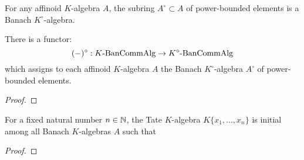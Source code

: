             \begin{lemma} \label{lemma: power_bounded_subrings_of_affinoid_algebras_are_banach}
                For any affinoid $K$-algebra $A$, the subring $A^{\circ} \subset A$ of power-bounded elements is a Banach $K^{\circ}$-algebra.
            \end{lemma}
            \begin{proposition} \label{prop: unit_discs_are_mapped_to_unit_discs}
                There is a functor:
                    $$(-)^{\circ}: K\text{-}\mathrm{Ban}\mathrm{Comm}\mathrm{Alg} \to K^{\circ}\text{-}\mathrm{Ban}\mathrm{Comm}\mathrm{Alg}$$
                which assigns to each affinoid $K$-algebra $A$ the Banach $K^{\circ}$-algebra $A^{\circ}$ of power-bounded elements. 
            \end{proposition}
                \begin{proof}
                    
                \end{proof}
            \begin{proposition} \label{prop: tate_algebras_are_free_affinoid_algebras}
                For a fixed natural number $n \in \mathbb{N}$, the Tate $K$-algebra $K\{x_1, ..., x_n\}$ is initial among all Banach $K$-algebras $A$ such that 
            \end{proposition}
                \begin{proof}
                    
                \end{proof}
            
